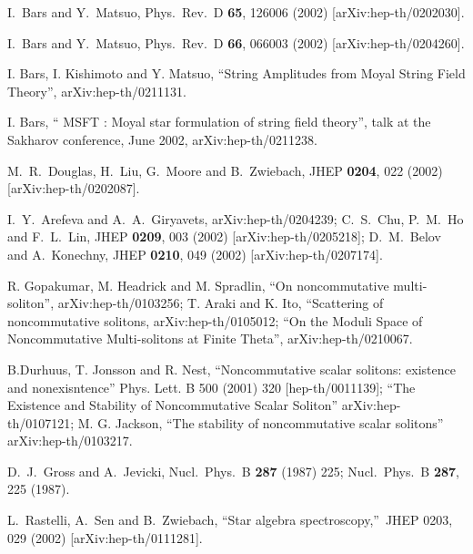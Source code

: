 \documentclass[a4paper,aps,preprint,nofootinbib,eqsecnum]{revtex4}
\begin{document}
\begin{thebibliography}{99}
 {\small I.~Bars and Y.~Matsuo,
Phys.\ Rev.\ D \textbf{65}, 126006 (2002) [arXiv:hep-th/0202030].
}

 {\small I.~Bars and Y.~Matsuo,
Phys.\ Rev.\ D \textbf{66}, 066003 (2002) [arXiv:hep-th/0204260].
}

 {\small I. Bars, I. Kishimoto and Y. Matsuo, ``String
Amplitudes from Moyal String Field Theory'', arXiv:hep-th/0211131. }

 {\small I. Bars, `` MSFT : Moyal star formulation of string
field theory'', talk at the Sakharov conference, June 2002,
arXiv:hep-th/0211238. }

 {\small M.~R.~Douglas, H.~Liu, G.~Moore and B.~Zwiebach,
JHEP \textbf{0204}, 022 (2002) [arXiv:hep-th/0202087]. }

 {\small %
I.~Y.~Arefeva and A.~A.~Giryavets,
arXiv:hep-th/0204239;\newline
%
%
C.~S.~Chu, P.~M.~Ho and F.~L.~Lin,
JHEP \textbf{0209}, 003 (2002) [arXiv:hep-th/0205218];\newline
%
%
D.~M.~Belov and A.~Konechny,
JHEP \textbf{0210}, 049 (2002) [arXiv:hep-th/0207174].
}

 {\small R. Gopakumar, M. Headrick and M.
Spradlin, ``On noncommutative multi-soliton'', arXiv:hep-th/0103256;\newline
T. Araki and K. Ito, ``Scattering of noncommutative \coordHE{} solitons,
arXiv:hep-th/0105012; ``On the Moduli Space of Noncommutative Multi-solitons
at Finite Theta'', arXiv:hep-th/0210067. }

 {\small B.Durhuus, T. Jonsson and R. Nest,
``Noncommutative scalar solitons: existence and nonexisntence'' Phys. Lett.
B 500 (2001) 320 [hep-th/0011139]; ``The Existence and Stability of
Noncommutative Scalar Soliton'' arXiv:hep-th/0107121;\newline
M. G. Jackson, ``The stability of noncommutative scalar solitons''
arXiv:hep-th/0103217. }

 {\small %
D.~J.~Gross and A.~Jevicki, Nucl.\ Phys.\ B \textbf{287} (1987) 225;
Nucl.\ Phys.\ B \textbf{287}, 225 (1987). %
}

 {\small L.~Rastelli, A.~Sen and B.~Zwiebach,
\textquotedblleft Star algebra spectroscopy,\textquotedblright\  JHEP 0203,
029 (2002) [arXiv:hep-th/0111281].}


\end{thebibliography}
\end{document}
